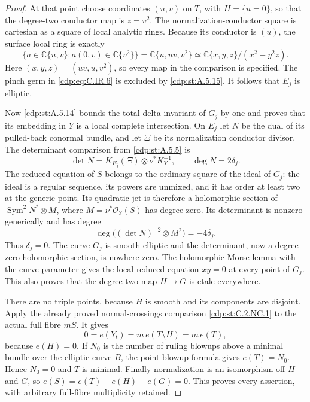 \begin{proof}
At that point choose coordinates $(u,v)$ on $T$, with
$H=\{u=0\}$, so that the degree-two conductor map is
$z=v^2$. The normalization-conductor square is cartesian
as a square of local analytic rings. Because its conductor
is $(u)$, the surface local ring is exactly
\[
 \{a\in\mathbb C\{u,v\}:a(0,v)\in\mathbb C\{v^2\}\}
   =\mathbb C\{u,uv,v^2\}
   \simeq\mathbb C\{x,y,z\}/(x^2-y^2z).       \tag{C.IR.6}\label{cdp:eq:C.IR.6}
\]
Here $(x,y,z)=(uv,u,v^2)$, so every map in the comparison
is specified. The pinch germ in \eqref{cdp:eq:C.IR.6} is excluded by
\ref{cdp:st:A.5.15}. It follows that $E_j$ is elliptic.

Now \ref{cdp:st:A.5.14} bounds the total delta invariant of $G_j$ by one
and proves that its embedding in $Y$ is a local complete
intersection. On $E_j$ let $N$ be the dual of its pulled-back
conormal bundle, and let $\Xi$ be its normalization conductor
divisor. The determinant comparison from \ref{cdp:st:A.5.5} is
\[
 \det N=K_{E_j}(\Xi)\otimes\nu^*K_Y^{-1},
 \qquad \deg N=2\delta_j.                       \tag{C.IR.7}\label{cdp:eq:C.IR.7}
\]
The reduced equation of $S$ belongs to the ordinary square
of the ideal of $G_j$: the ideal is a regular sequence,
its powers are unmixed, and it has order at least two at
the generic point. Its quadratic jet is therefore a
holomorphic section of $\operatorname{Sym}^2N^*\otimes M$,
where $M=\nu^*\mathcal O_Y(S)$ has degree zero. Its determinant
is nonzero generically and has degree
\[
 \deg\bigl((\det N)^{-2}\otimes M^2\bigr)
                         =-4\delta_j.           \tag{C.IR.8}\label{cdp:eq:C.IR.8}
\]
Thus $\delta_j=0$. The curve $G_j$ is smooth elliptic and
the determinant, now a degree-zero holomorphic section,
is nowhere zero. The holomorphic Morse lemma with the
curve parameter gives the local reduced equation $xy=0$
at every point of $G_j$. This also proves that the
degree-two map $H\to G$ is etale everywhere.

There are no triple points, because $H$ is smooth and its
components are disjoint. Apply the already proved
normal-crossings comparison \ref{cdp:st:C.2.NC.1} to the actual full
fibre $mS$. It gives
\[
 0=e(Y_t)=m\,e(T\setminus H)=m\,e(T),            \tag{C.IR.9}\label{cdp:eq:C.IR.9}
\]
because $e(H)=0$. If $N_0$ is the number of ruling blowups
above a minimal bundle over the elliptic curve $B$, the
point-blowup formula gives $e(T)=N_0$. Hence $N_0=0$ and
$T$ is minimal. Finally normalization is an isomorphism
off $H$ and $G$, so
$e(S)=e(T)-e(H)+e(G)=0$. This proves every assertion,
with arbitrary full-fibre multiplicity retained.
\end{proof}

